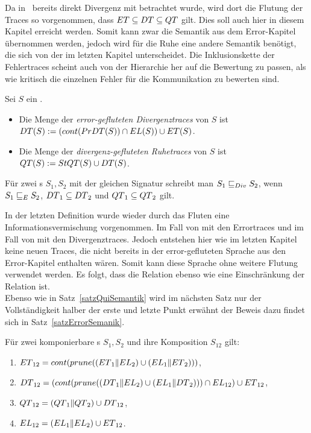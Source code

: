 Da in~\cite{Chilton2013} bereits direkt Divergenz mit betrachtet wurde, wird
dort die Flutung der Traces so vorgenommen, dass $ET\subseteq DT\subseteq
QT$ gilt. Dies soll auch hier in diesem Kapitel erreicht werden. Somit kann
zwar die Semantik aus dem Error-Kapitel übernommen werden, jedoch wird für die
Ruhe eine andere Semantik benötigt, die sich von der im letzten Kapitel
unterscheidet. Die Inklusionskette der Fehlertraces scheint auch von der
Hierarchie her auf die Bewertung zu passen, als wie kritisch die einzelnen
Fehler für die Kommunikation zu bewerten sind.

\begin{Def}
\label{DefRuheDivSemantik}
  Sei $S$ ein \EIO{}.
  \begin{itemize}
    \item Die Menge der \emph{error-gefluteten Divergenztraces} von $S$ ist
      $DT{}(S) := (cont{}(PrDT{}(S))\cap EL{}(S))\cup ET{}(S)$.
    \item Die Menge der \emph{divergenz-gefluteten Ruhetraces} von $S$ ist
      $QT{}(S) := StQT{}(S)\cup DT{}(S)$.
  \end{itemize}
  Für zwei \EIO{}s $S_1, S_2$ mit der gleichen Signatur schreibt man $S_1\sqsubseteq _{Div}
  S_2$, wenn $S_1\sqsubseteq _E S_2$, $DT{}_1\subseteq DT{}_2$ und
  $QT{}_1\subseteq QT{}_2$ gilt.
\end{Def}

In der letzten Definition wurde wieder durch das Fluten eine
Informationsvermischung vorgenommen. Im Fall von \DT{} mit den Errortraces und
im Fall von \QT{} mit den Divergenztraces. Jedoch entstehen hier wie im letzten
Kapitel keine neuen Traces, die nicht bereits in der error-gefluteten Sprache
\EL{} aus den Error-Kapitel enthalten wären. Somit kann diese Sprache ohne
weitere Flutung verwendet werden. Es folgt, dass die Relation \DRel{} ebenso
wie \QRel{} eine Einschränkung der Relation \ERel{} ist.\\
Ebenso wie in Satz~\ref{satzQuiSemantik} wird im nächsten Satz nur der
Vollständigkeit halber der erste und letzte Punkt erwähnt der Beweis dazu
findet sich in Satz~\ref{satzErrorSemanik}.

\begin{satz}
\label{satzDivSemantik}
  Für zwei komponierbare \EIO{}s $S_1, S_2$ und ihre Komposition
  $S_{12}$ gilt:
  \begin{enumerate}
    \item $ET{}_{12}=cont (prune ((ET{}_1\|EL{}_2)\cup
      (EL{}_1\|ET{}_2)))$,
    \item $DT{}_{12}= (cont{}(prune{}((DT{}_1\|EL{}_2)\cup
      (EL{}_1\|DT{}_2)))\cap EL_{12})\cup ET{}_{12}$,
    \item $QT{}_{12}=(QT{}_1\|QT{}_2)\cup DT{}_{12}$,
    \item $EL{}_{12}=(EL{}_1\|EL{}_2)\cup ET{}_{12}$.
  \end{enumerate}
\end{satz}

